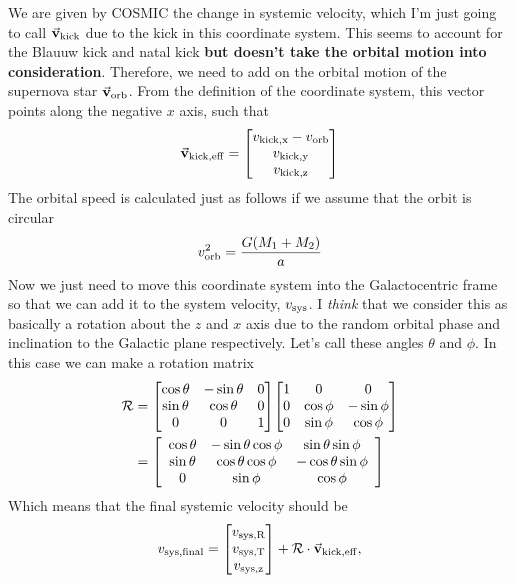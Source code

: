 \documentclass[12pt, letterpaper, twoside]{article}
\begin{document}
We are given by COSMIC the change in systemic velocity, which I'm just going to call $\va{v}_{\rm kick}$ due to the kick in this coordinate system. This seems to account for the Blauuw kick and natal kick \textbf{but doesn't take the orbital motion into consideration}. Therefore, we need to add on the orbital motion of the supernova star $\va{v}_{\rm orb}$. From the definition of the coordinate system, this vector points along the negative $x$ axis, such that
\begin{equation}
    \va{v}_{\rm kick, eff} = \mqty[v_{\rm kick, x} - v_{\rm orb} \\ v_{\rm kick, y} \\ v_{\rm kick, z}]
\end{equation}
The orbital speed is calculated just as follows if we assume that the orbit is circular
\begin{equation}
    v_{\rm orb}^2 = \frac{G (M_1 + M_2)}{a}
\end{equation}
Now we just need to move this coordinate system into the Galactocentric frame so that we can add it to the system velocity, $v_{\rm sys}$. I \textit{think} that we consider this as basically a rotation about the $z$ and $x$ axis due to the random orbital phase and inclination to the Galactic plane respectively. Let's call these angles $\theta$ and $\phi$. In this case we can make a rotation matrix
\begin{align}
    \mathcal{R} &= \mqty[ \cos \theta & - \sin \theta & 0 \\ \sin \theta & \cos \theta & 0 \\ 0 & 0 & 1 ] \mqty[ 1 & 0 & 0 \\ 0 & \cos \phi & - \sin \phi \\ 0 & \sin \phi & \cos \phi ] \\
                &= \left[
                    \begin{array}{ccc}
                     \cos \theta & - \sin \theta \cos \phi & \sin \theta \sin \phi \\
                     \sin \theta & \cos \theta \cos \phi & -\cos \theta \sin \phi \\
                     0 & \sin \phi & \cos \phi \\
                    \end{array}
                    \right]
\end{align}
Which means that the final systemic velocity should be
\begin{equation}
    v_{\rm sys, final} = \mqty[v_{\rm sys, R} \\ v_{\rm sys, T} \\ v_{\rm sys, z}] + \mathcal{R} \cdot \va{v}_{\rm kick, eff},
\end{equation}
\end{document}
